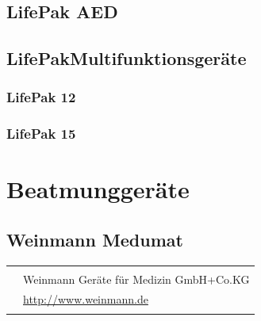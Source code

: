 




\subsection{LifePak AED}

\subsection{LifePak\texttrademark Multifunktionsgeräte}

\subsubsection{LifePak 12}

\subsubsection{LifePak 15}

\section{Beatmunggeräte}

\subsection{Weinmann Medumat}

\begin{table}[H]
\begin{tabulary}{\linewidth}{LL}
&
\\\addlinespace\midrule\addlinespace
{}
&
Weinmann Geräte für Medizin GmbH+Co.KG
\\\addlinespace
{}
&
\url{http://www.weinmann.de}
\\\addlinespace\bottomrule
\end{tabulary}
\end{table}

